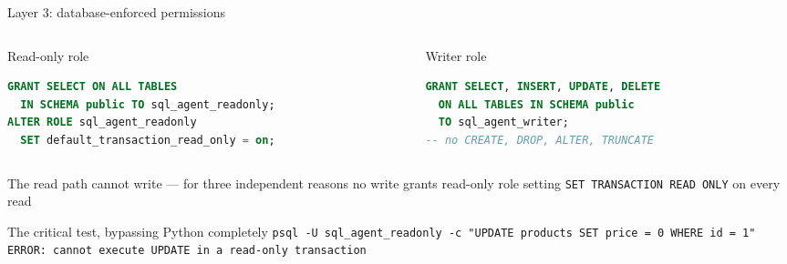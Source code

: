 \documentclass[aspectratio=169,10pt]{beamer}
\begin{document}
\begin{frame}[fragile]{Layer 3: database-enforced permissions}
  \begin{columns}[T]
    \begin{column}{0.5\textwidth}
      \begin{block}{\footnotesize Read-only role}
\begin{lstlisting}[language=SQL]
GRANT SELECT ON ALL TABLES
  IN SCHEMA public TO sql_agent_readonly;
ALTER ROLE sql_agent_readonly
  SET default_transaction_read_only = on;
\end{lstlisting}
      \end{block}
    \end{column}
    \begin{column}{0.5\textwidth}
      \begin{block}{\footnotesize Writer role}
\begin{lstlisting}[language=SQL]
GRANT SELECT, INSERT, UPDATE, DELETE
  ON ALL TABLES IN SCHEMA public
  TO sql_agent_writer;
-- no CREATE, DROP, ALTER, TRUNCATE
\end{lstlisting}
      \end{block}
    \end{column}
  \end{columns}

  \begin{block}{\footnotesize The read path cannot write --- for three independent reasons}
    \footnotesize no write grants \textperiodcentered{} read-only role setting
    \textperiodcentered{} \texttt{SET TRANSACTION READ ONLY} on every read
  \end{block}

  \begin{alertblock}{\footnotesize The critical test, bypassing Python completely}
    \footnotesize
    \texttt{psql -U sql\_agent\_readonly -c "UPDATE products SET price = 0 WHERE id = 1"}\\
    \texttt{ERROR: cannot execute UPDATE in a read-only transaction}
  \end{alertblock}
\end{frame}
\end{document}
